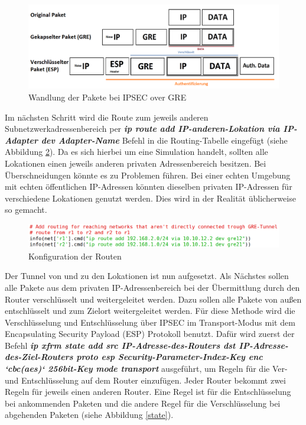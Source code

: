 \documentclass[fontsize=12pt,paper=a4,open=any,parskip=half,
  twoside=false,toc=listof,toc=bibliography,fleqn,leqno,
  captions=nooneline,captions=tableabove,british]{scrbook}
\begin{document}
\begin{figure}[H]
	\centering
	\includegraphics[width=1.0\textwidth]{Bilder/ipsecgre}
	\captionsetup{justification=centering,margin=2cm}
	\caption{Wandlung der Pakete bei IPSEC over GRE}
	\label{ipsecgre}
\end{figure}

Im nächsten Schritt wird die Route zum jeweils anderen Subnetzwerkadressenbereich per \textit{\textbf{ip route add IP-anderen-Lokation via IP-Adapter dev Adapter-Name}} Befehl in die Routing-Tabelle eingefügt (siehe Abbildung \ref{route}). Da es sich hierbei um eine Simulation handelt, sollten alle Lokationen einen jeweils anderen privaten Adressenbereich besitzen. Bei Überschneidungen könnte es zu Problemen führen. Bei einer echten Umgebung mit echten öffentlichen IP-Adressen könnten dieselben privaten IP-Adressen für verschiedene Lokationen genutzt werden. Dies wird in der Realität üblicherweise so gemacht.

\begin{figure}[H]
 \centering
 \includegraphics[width=1.0\textwidth]{Bilder/route}
 \captionsetup{justification=centering,margin=2cm}
 \caption{Konfiguration der Routen}
 \label{route}
\end{figure}


Der Tunnel von und zu den Lokationen ist nun aufgesetzt. Als Nächstes sollen alle Pakete aus dem privaten IP-Adressenbereich bei der Übermittlung durch den Router verschlüsselt und weitergeleitet werden. Dazu sollen alle Pakete von außen entschlüsselt und zum Zielort weitergeleitet werden. Für diese Methode wird die Verschlüsselung und Entschlüsselung über IPSEC im Transport-Modus mit dem Encapsulating Security Payload (ESP) Protokoll benutzt. Dafür wird zuerst der Befehl \textit{\textbf{ip xfrm state add src IP-Adresse-des-Routers dst IP-Adresse-des-Ziel-Routers proto esp Security-Parameter-Index-Key enc ‘cbc(aes)‘ 256bit-Key mode transport}} ausgeführt, um Regeln für die Ver- und Entschlüsselung auf dem Router einzufügen. Jeder Router bekommt zwei Regeln für jeweils einen anderen Router. Eine Regel ist für die Entschlüsselung bei ankommenden Paketen und die andere Regel für die Verschlüsselung bei abgehenden Paketen (siehe Abbildung \ref{state}).
\end{document}
